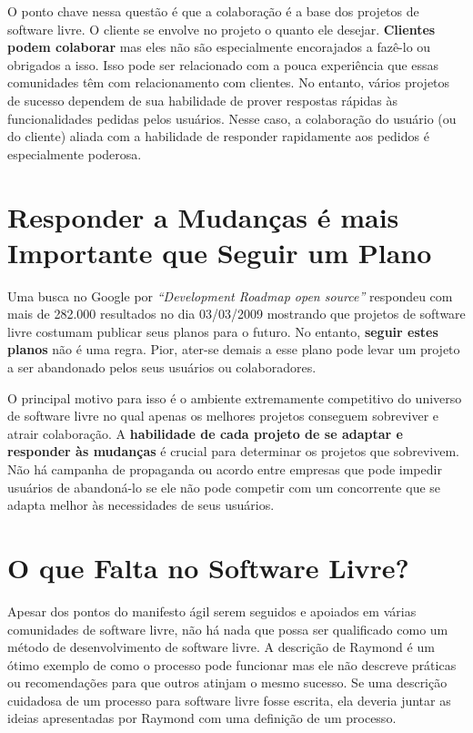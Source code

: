 O ponto chave nessa questão é que a colaboração é a base dos projetos
de software livre.  O cliente se envolve no projeto o quanto ele
desejar. \textbf{Clientes podem colaborar} mas eles não são
especialmente encorajados a fazê-lo ou obrigados a isso. Isso pode ser
relacionado com a pouca experiência que essas comunidades têm com
relacionamento com clientes. No entanto, vários projetos de sucesso
dependem de sua habilidade de prover respostas rápidas às
funcionalidades pedidas pelos usuários. Nesse caso, a colaboração do
usuário (ou do cliente) aliada com a habilidade de responder
rapidamente aos pedidos é especialmente poderosa.

\section{Responder a Mudanças é mais Importante que Seguir um Plano}
\label{sec:fourth-princ}

Uma busca no Google por \emph{``Development Roadmap open source''}
respondeu com mais de 282.000 resultados no dia 03/03/2009 mostrando
que projetos de software livre costumam publicar seus planos para o
futuro. No entanto, \textbf{seguir estes planos} não é uma
regra. Pior, ater-se demais a esse plano pode levar um projeto a ser
abandonado pelos seus usuários ou colaboradores.

O principal motivo para isso é o ambiente extremamente competitivo do
universo de software livre no qual apenas os melhores projetos
conseguem sobreviver e atrair colaboração. A \textbf{habilidade de
  cada projeto de se adaptar e responder às mudanças} é crucial para
determinar os projetos que sobrevivem. Não há campanha de propaganda
ou acordo entre empresas que pode impedir usuários de abandoná-lo se
ele não pode competir com um concorrente que se adapta melhor às
necessidades de seus usuários.

\section{O que Falta no Software Livre?}
\label{sec:os-summary}

Apesar dos pontos do manifesto ágil serem seguidos e apoiados em
várias comunidades de software livre, não há nada que possa ser
qualificado como um método de desenvolvimento de software livre. A
descrição de Raymond \cite{Raymond1999} é um ótimo exemplo de como o
processo pode funcionar mas ele não descreve práticas ou recomendações
para que outros atinjam o mesmo sucesso. Se uma descrição cuidadosa de
um processo para software livre fosse escrita, ela deveria juntar as
ideias apresentadas por Raymond com uma definição de um processo.

